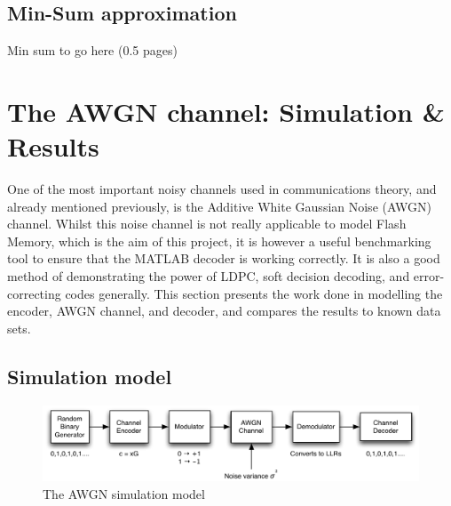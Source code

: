 \documentclass[11pt]{article}
\numberwithin{equation}{subsection}
\begin{document}
\subsection{Min-Sum approximation}

Min sum to go here (0.5 pages)

\section{The AWGN channel: Simulation \& Results}
One of the most important noisy channels used in communications theory, and already mentioned previously, is the Additive White Gaussian Noise (AWGN) channel. Whilst this noise channel is not really applicable to model Flash Memory, which is the aim of this project, it is however a useful benchmarking tool to ensure that the MATLAB decoder is working correctly. It is also a good method of demonstrating the power of LDPC, soft decision decoding, and error-correcting codes generally. This section presents the work done in modelling the encoder, AWGN channel, and decoder, and compares the results to known data sets.

\subsection{Simulation model}
\begin{figure}[h]
\centering
\includegraphics[scale=0.878]{awgn_channel_model}
\caption{The AWGN simulation model}
\label{figure:awgn sim model}
\end{figure}
\end{document}
